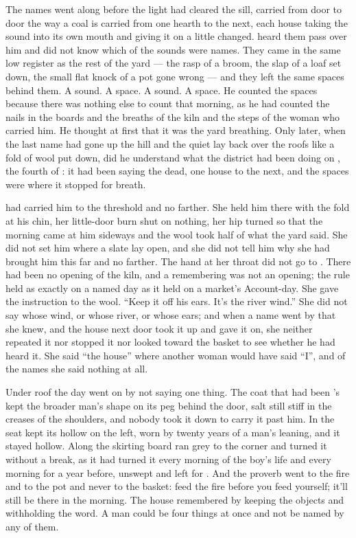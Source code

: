 
The names went along  before the light had cleared the sill, carried from door to door the way a coal is carried from one hearth to the next, each house taking the sound into its own mouth and giving it on a little changed.  heard them pass over him and did not know which of the sounds were names. They came in the same low register as the rest of the yard --- the rasp of a broom, the slap of a loaf set down, the small flat knock of a pot gone wrong --- and they left the same spaces behind them. A sound. A space. A sound. A space. He counted the spaces because there was nothing else to count that morning, as he had counted the nails in the boards and the breaths of the kiln and the steps of the woman who carried him. He thought at first that it was the yard breathing. Only later, when the last name had gone up the hill and the quiet lay back over the roofs like a fold of wool put down, did he understand what the district had been doing on , the fourth of : it had been saying the dead, one house to the next, and the spaces were where it stopped for breath.

 had carried him to the threshold and no farther. She held him there with the fold at his chin, her little-door burn shut on nothing, her hip turned so that the morning came at him sideways and the wool took half of what the yard said. She did not set him where a slate lay open, and she did not tell him why she had brought him this far and no farther. The hand at her throat did not go to . There had been no opening of the kiln, and a remembering was not an opening; the rule held as exactly on a named day as it held on a market's Account-day. She gave the instruction to the wool. “Keep it off his ears. It's the river wind.” She did not say whose wind, or whose river, or whose ears; and when a name went by that she knew, and the house next door took it up and gave it on, she neither repeated it nor stopped it nor looked toward the basket to see whether he had heard it. She said “the house” where another woman would have said “I”, and of the names she said nothing at all.

Under  roof the day went on by not saying one thing. The coat that had been 's kept the broader man's shape on its peg behind the door, salt still stiff in the creases of the shoulders, and nobody took it down to carry it past him. In  the seat kept its hollow on the left, worn by twenty years of a man's leaning, and it stayed hollow. Along the skirting board  ran grey to the corner and turned it without a break, as it had turned it every morning of the boy's life and every morning for a year before, unswept and left for . And the proverb went to the fire and to the pot and never to the basket: feed the fire before you feed yourself; it'll still be there in the morning. The house remembered by keeping the objects and withholding the word. A man could be four things at once and not be named by any of them.

